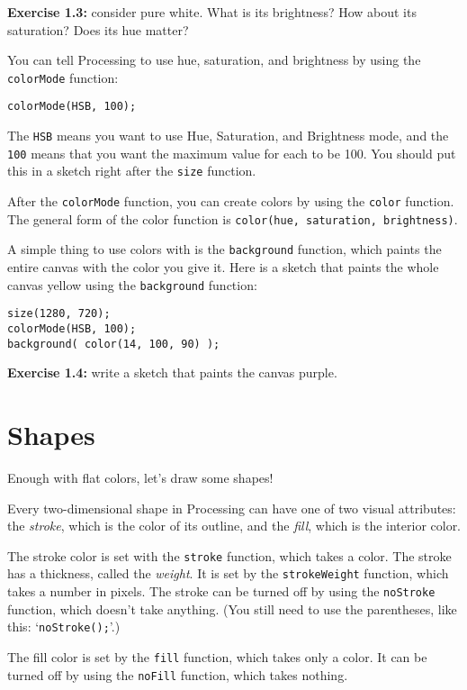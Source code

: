 \documentclass[
]{leaflet}
\begin{document}
\textbf{Exercise 1.3:} consider pure white. What is its brightness? How about its saturation? Does its hue matter?

You can tell Processing to use hue, saturation, and brightness by using the \texttt{colorMode} function:

\begin{lstlisting}
colorMode(HSB, 100);
\end{lstlisting}

The \texttt{HSB} means you want to use Hue, Saturation, and Brightness mode, and the \texttt{100} means that you want the maximum value for each to be 100.
You should put this in a sketch right after the \texttt{size} function.

After the \texttt{colorMode} function, you can create colors by using the \texttt{color} function.
The general form of the color function is \texttt{color(hue, saturation, brightness)}.

A simple thing to use colors with is the \texttt{background} function, which paints the entire canvas with the color you give it.
Here is a sketch that paints the whole canvas yellow using the \texttt{background} function:

\begin{lstlisting}
size(1280, 720);
colorMode(HSB, 100);
background( color(14, 100, 90) );
\end{lstlisting}

\textbf{Exercise 1.4:} write a sketch that paints the canvas purple.

\section{Shapes}

Enough with flat colors, let's draw some shapes!

Every two-dimensional shape in Processing can have one of two visual attributes: the \textit{stroke}, which is the color of its outline, and the \textit{fill}, which is the interior color.

The stroke color is set with the \texttt{stroke} function, which takes a color.
The stroke has a thickness, called the \textit{weight}.
It is set by the \texttt{strokeWeight} function, which takes a number in pixels.
The stroke can be turned off by using the \texttt{noStroke} function, which doesn't take anything.
(You still need to use the parentheses, like this: `\texttt{noStroke();}'.)

The fill color is set by the \texttt{fill} function, which takes only a color.
It can be turned off by using the \texttt{noFill} function, which takes nothing.
\end{document}
